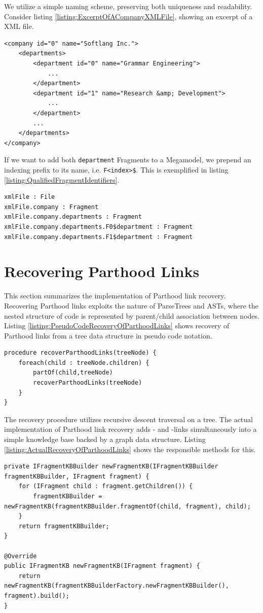 We utilize a simple naming scheme, preserving both uniqueness and readability.
Consider listing \ref{listing:ExcerptOfACompanyXMLFile}, showing an excerpt of a \gls{XML} file.
\begin{lstlisting}[caption={Excerpt of a Company XML file},label={listing:ExcerptOfACompanyXMLFile}]
<company id="0" name="Softlang Inc.">
    <departments>
        <department id="0" name="Grammar Engineering">
			...
        </department>
        <department id="1" name="Research &amp; Development">
            ...
        </department>
        ...
    </departments>
</company>
\end{lstlisting}
If we want to add both \texttt{department} \glspl{Fragment} to a \gls{Megamodel}, we prepend an indexing prefix to its name, i.e. \texttt{F<index>\$}.
This is exemplified in listing \ref{listing:QualifiedFragmentIdentifiers}.
\begin{lstlisting}[caption={Qualified Fragment Identifiers},label={listing:QualifiedFragmentIdentifiers}]
xmlFile : File
xmlFile.company : Fragment
xmlFile.company.departments : Fragment
xmlFile.company.departments.F0$department : Fragment
xmlFile.company.departments.F1$department : Fragment
\end{lstlisting}


\section{Recovering Parthood Links}
\label{section:RecoveringParthoodLinks}
This section summarizes the implementation of \gls{Parthood} link recovery.
Recovering \gls{Parthood} links exploits the nature of \glspl{ParseTree} and \glspl{AST}, where the nested structure of code is represented by parent/child association between nodes.
Listing \ref{listing:PseudoCodeRecoveryOfParthoodLinks} shows recovery of \gls{Parthood} links from a tree data structure in pseudo code notation.
\begin{lstlisting}[caption={Pseudo code Recovery of Parthood Links},label={listing:PseudoCodeRecoveryOfParthoodLinks}]
procedure recoverParthoodLinks(treeNode) {
	foreach(child : treeNode.children) {
		partOf(child,treeNode)
		recoverParthoodLinks(treeNode)	
	}
}
\end{lstlisting}
The recovery procedure utilizes recursive descent traversal on a tree.
The actual implementation of \gls{Parthood} link recovery adds \partOf- and \fragmentOf-links simultaneously into a simple knowledge base backed by a graph data structure.
Listing \ref{listing:ActualRecoveryOfParthoodLinks} shows the responsible methods for this.
\begin{lstlisting}[caption={Actual Recovery of Parthood Links},label={listing:ActualRecoveryOfParthoodLinks}]
private IFragmentKBBuilder newFragmentKB(IFragmentKBBuilder fragmentKBBuilder, IFragment fragment) {
    for (IFragment child : fragment.getChildren()) {
        fragmentKBBuilder = newFragmentKB(fragmentKBBuilder.fragmentOf(child, fragment), child);
    }
    return fragmentKBBuilder;
}

@Override
public IFragmentKB newFragmentKB(IFragment fragment) {
	return newFragmentKB(fragmentKBBuilderFactory.newFragmentKBBuilder(), fragment).build();
}
\end{lstlisting}


